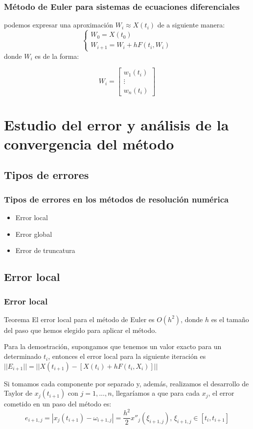 \documentclass{beamer}
\begin{document}
\begin{frame}
	\frametitle{Método de Euler para sistemas de ecuaciones diferenciales}
	
	podemos expresar una aproximación $W_i \approx X(t_i)$ de a siguiente manera:
	$$
	\begin{cases}
	W_0=X(t_0)\\
	W_{i+1}=W_i + hF(t_i,W_i)
	\end{cases}
	$$
	donde $W_i$ es de la forma:
	
	\begin{equation*}
	W_i=\begin{bmatrix}
	w_1(t_i) \\
	\vdots \\
	w_n(t_i)
	\end{bmatrix}
	\end{equation*}
	
	
\end{frame}

\section{Estudio del error y análisis de la convergencia del método}

\subsection{Tipos de errores}
\begin{frame}
	\frametitle{Tipos de errores en los métodos de resolución numérica}

	\begin{itemize}
	\item Error local
	\item Error global
	\item Error de truncatura
	\end{itemize}

\end{frame}

\subsection{Error local}
\begin{frame}
	\frametitle{Error local}
	\begin{block}{Teorema}
	El error local para el método de Euler es $O(h^2)$, donde $h$ es el tamaño del paso que hemos elegido para aplicar el método.
	\end{block}
	
	Para la demostración, supongamos que tenemos un valor exacto para un determinado $t_i$, entonces el error local para la siguiente iteración es $|| E_{i+1} || = ||X(t_{i+1}) - [X(t_{i}) + hF(t_i, X_i)] ||$
	
	Si tomamos cada componente por separado y, además, realizamos el desarrollo de Taylor de $x_j(t_{i+1})$ con $j=1,...,n$, llegaríamos a que para cada $x_j$, el error cometido en un paso del método es:
	$$ e_{i+1, j} = | x_j(t_{i+1}) - \omega_{i+1, j} | = \frac{h^2}{2}x''_j(\xi_{i+1, j}),\, \xi_{i+1, j} \in [t_i, t_{i+1}] $$	
	
\end{frame}
\end{document}

